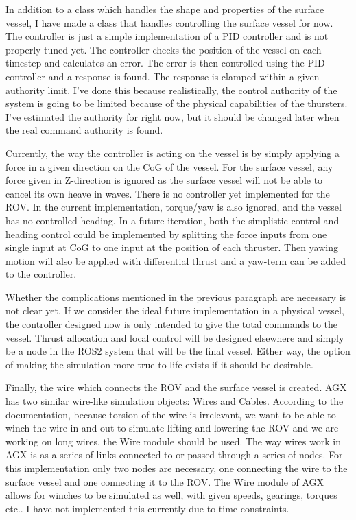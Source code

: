 In addition to a class which handles the shape and properties of the surface vessel, I have made a class that handles controlling the surface vessel for now. The controller is just a simple implementation of a PID controller and is not properly tuned yet. The controller checks the position of the vessel on each timestep and calculates an error. The error is then controlled using the PID controller and a response is found. The response is clamped within a given authority limit. I've done this because realistically, the control authority of the system is going to be limited because of the physical capabilities of the thursters. I've estimated the authority for right now, but it should be changed later when the real command authority is found. 

Currently, the way the controller is acting on the vessel is by simply applying a force in a given direction on the CoG of the vessel. For the surface vessel, any force given in Z-direction is ignored as the surface vessel will not be able to cancel its own heave in waves. There is no controller yet implemented for the ROV. In the current implementation, torque/yaw is also ignored, and the vessel has no controlled heading. In a future iteration, both the simplistic control and heading control could be implemented by splitting the force inputs from one single input at CoG to one input at the position of each thruster. Then yawing motion will also be applied with differential thrust and a yaw-term can be added to the controller. 

Whether the complications mentioned in the previous paragraph are necessary is not clear yet. If we consider the ideal future implementation in a physical vessel, the controller designed now is only intended to give the total commands to the vessel. Thrust allocation and local control will be designed elsewhere and simply be a node in the ROS2 system that will be the final vessel. Either way, the option of making the simulation more true to life exists if it should be desirable. 

Finally, the wire which connects the ROV and the surface vessel is created. AGX has two similar wire-like simulation objects: Wires and Cables. According to the documentation, because torsion of the wire is irrelevant, we want to be able to winch the wire in and out to simulate lifting and lowering the ROV and we are working on long wires, the Wire module should be used. The way wires work in AGX is as a series of links connected to or passed through a series of nodes. For this implementation only two nodes are necessary, one connecting the wire to the surface vessel and one connecting it to the ROV. The Wire module of AGX allows for winches to be simulated as well, with given speeds, gearings, torques etc.. I have not implemented this currently due to time constraints. 

